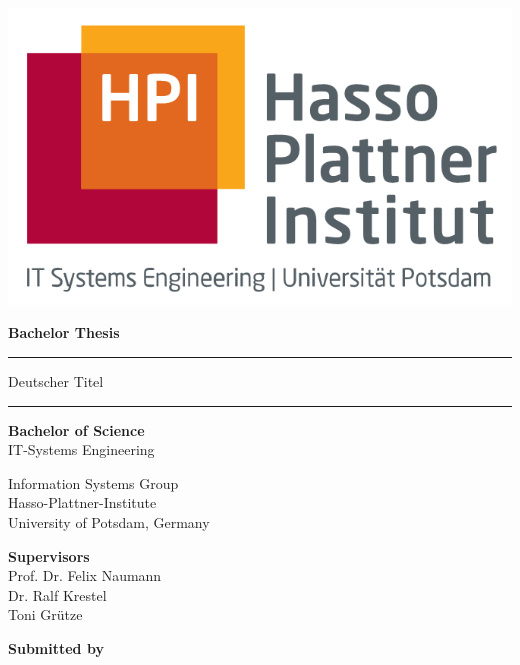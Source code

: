 \begin{titlepage}
  \begin{center} 	
	
		\includegraphics[scale=.3]{images/HPI.png}
		
		\vspace{1cm}
		
		{\Large\bfseries Bachelor Thesis \par}
		
		\vspace{0.5cm}
    
		\rule{\textwidth}{0.4pt}
    {\LARGE\bfseries{\thetitle} \par}
    
    \vspace{0.5cm}
                
    {\large\bfseries{Deutscher Titel \par}}
		\rule{\textwidth}{0.4pt}

        
    \vspace{1cm}

    {\large\bfseries{Bachelor of Science}} \\
    IT-Systems Engineering
    \vspace{0.3cm}
    
    Information Systems Group \\
    Hasso-Plattner-Institute \\
    University of Potsdam, Germany
    
    \vspace{1.3cm}
   	
		\textbf{Supervisors}\\ 
		Prof. Dr. Felix Naumann\\
		Dr. Ralf Krestel\\
    Toni Grütze
 
    \vspace{0.8cm}

		\textbf{Submitted by}\\
		\theauthor
			
    \vspace{0.8cm}
		
    \usvardate{}
  \end{center}
\end{titlepage}

